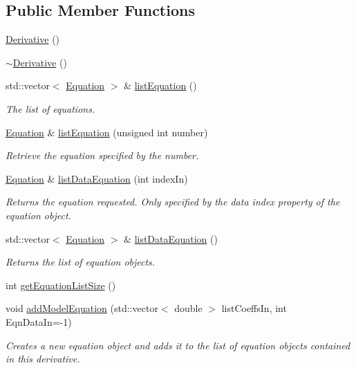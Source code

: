 \subsection*{Public Member Functions}
\begin{DoxyCompactItemize}
\item 
\hyperlink{classosea_1_1ofreq_1_1_derivative_adc03ec3ad150bc0de66a3e7200cd368f}{Derivative} ()
\item 
\hyperlink{classosea_1_1ofreq_1_1_derivative_a7fc4ee53f460dfb98b3db2e9c9830cf9}{$\sim$\-Derivative} ()
\item 
std\-::vector$<$ \hyperlink{classosea_1_1ofreq_1_1_equation}{Equation} $>$ \& \hyperlink{classosea_1_1ofreq_1_1_derivative_a7fa63ee738fcafcf3fccb796da095946}{list\-Equation} ()
\begin{DoxyCompactList}\small\item\em The list of equations. \end{DoxyCompactList}\item 
\hyperlink{classosea_1_1ofreq_1_1_equation}{Equation} \& \hyperlink{classosea_1_1ofreq_1_1_derivative_a57fc9f8fc2bb6b416b9ade4f79f2bf1d}{list\-Equation} (unsigned int number)
\begin{DoxyCompactList}\small\item\em Retrieve the equation specified by the number. \end{DoxyCompactList}\item 
\hyperlink{classosea_1_1ofreq_1_1_equation}{Equation} \& \hyperlink{classosea_1_1ofreq_1_1_derivative_a11a3da237e1cf7a4fe03d38b131aab0f}{list\-Data\-Equation} (int index\-In)
\begin{DoxyCompactList}\small\item\em Returns the equation requested. Only specified by the data index property of the equation object. \end{DoxyCompactList}\item 
std\-::vector$<$ \hyperlink{classosea_1_1ofreq_1_1_equation}{Equation} $>$ \& \hyperlink{classosea_1_1ofreq_1_1_derivative_ac783649fb9e8f4ab83bb666367a979c7}{list\-Data\-Equation} ()
\begin{DoxyCompactList}\small\item\em Returns the list of equation objects. \end{DoxyCompactList}\item 
int \hyperlink{classosea_1_1ofreq_1_1_derivative_ac95af6fb993314a578b3f0d3cd57a9cc}{get\-Equation\-List\-Size} ()
\item 
void \hyperlink{classosea_1_1ofreq_1_1_derivative_a1a50f2020c3a1408f963537218de5c5e}{add\-Model\-Equation} (std\-::vector$<$ double $>$ list\-Coeffs\-In, int Eqn\-Data\-In=-\/1)
\begin{DoxyCompactList}\small\item\em Creates a new equation object and adds it to the list of equation objects contained in this derivative. \end{DoxyCompactList}\end{DoxyCompactItemize}
